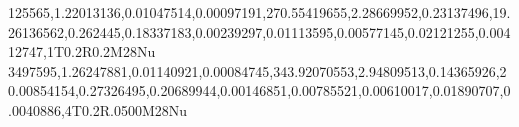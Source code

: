 125565,1.22013136,0.01047514,0.00097191,270.55419655,2.28669952,0.23137496,19.26136562,0.262445,0.18337183,0.00239297,0.01113595,0.00577145,0.02121255,0.00412747,1T0.2R0.2M28Nu
3497595,1.26247881,0.01140921,0.00084745,343.92070553,2.94809513,0.14365926,20.00854154,0.27326495,0.20689944,0.00146851,0.00785521,0.00610017,0.01890707,0.0040886,4T0.2R.0500M28Nu
